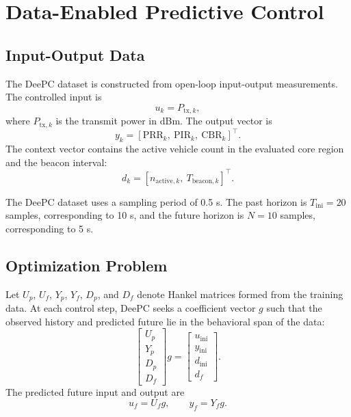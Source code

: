 \documentclass[conference]{IEEEtran}
\newcommand{\prr}{\mathrm{PRR}}
\newcommand{\pir}{\mathrm{PIR}}
\newcommand{\cbr}{\mathrm{CBR}}
\begin{document}
\section{Data-Enabled Predictive Control}

\subsection{Input-Output Data}

The DeePC dataset is constructed from open-loop input-output measurements. The controlled input is
\begin{equation}
u_k = P_{\mathrm{tx},k},
\end{equation}
where $P_{\mathrm{tx},k}$ is the transmit power in dBm. The output vector is
\begin{equation}
y_k = [\prr_k,\ \pir_k,\ \cbr_k]^\top.
\end{equation}
The context vector contains the active vehicle count in the evaluated core region and the beacon interval:
\begin{equation}
d_k = [n_{\mathrm{active},k},\ T_{\mathrm{beacon},k}]^\top.
\end{equation}

The DeePC dataset uses a sampling period of 0.5 s. The past horizon is $T_{\mathrm{ini}}=20$ samples, corresponding to 10 s, and the future horizon is $N=10$ samples, corresponding to 5 s.

\subsection{Optimization Problem}

Let $U_p$, $U_f$, $Y_p$, $Y_f$, $D_p$, and $D_f$ denote Hankel matrices formed from the training data. At each control step, DeePC seeks a coefficient vector $g$ such that the observed history and predicted future lie in the behavioral span of the data:
\begin{equation}
\begin{bmatrix}
U_p\\
Y_p\\
D_p\\
D_f
\end{bmatrix}g
=
\begin{bmatrix}
u_{\mathrm{ini}}\\
y_{\mathrm{ini}}\\
d_{\mathrm{ini}}\\
d_f
\end{bmatrix}.
\end{equation}
The predicted future input and output are
\begin{equation}
u_f = U_f g, \qquad y_f = Y_f g.
\end{equation}
\end{document}
